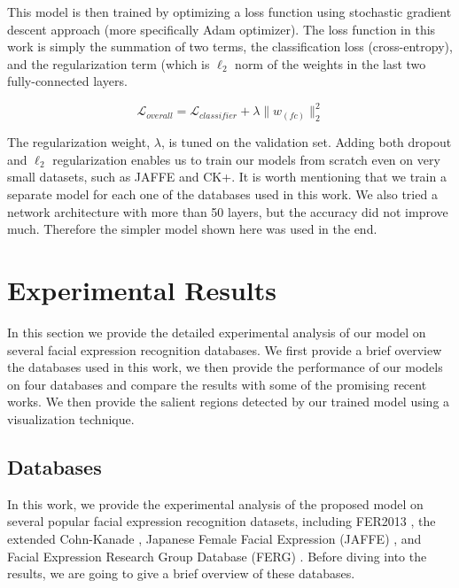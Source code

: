 \documentclass[conference]{IEEEtran}
\begin{document}
This model is then trained by optimizing a loss function using  stochastic gradient descent approach (more specifically Adam optimizer). The loss function in this work is simply the summation of two terms, the classification loss (cross-entropy), and the regularization term (which is $\ell_2$ norm of the weights in the last two fully-connected layers.

\begin{equation}
\mathcal{L}_{overall}= \mathcal{L}_{classifier}+ \lambda \|w_{(fc)}\|_2^2
\end{equation}

The regularization weight, $\lambda$, is tuned on the validation set. 
Adding both dropout and $\ell_2$ regularization enables us to train our models from scratch even on very small datasets, such as JAFFE and CK+. 
It is worth mentioning that we train a separate model for each one of the databases used in this work.
We also tried a network architecture with more than 50 layers, but the accuracy did not improve much. Therefore the simpler model shown here was used in the end.







\section{Experimental Results}
In this section we provide the detailed experimental analysis of our model on several facial expression recognition databases. We first provide a brief overview the databases used in this work, we then provide the performance of our models on four databases and compare the results with some of the promising recent works. 
We then provide the salient regions detected by our trained model using a visualization technique. 
\subsection{Databases}
In this work, we provide the experimental analysis of the proposed model on several popular facial expression recognition datasets, including FER2013 \cite{carrier2013fer}, the extended Cohn-Kanade \cite{ckplus}, Japanese Female Facial Expression (JAFFE) \cite{lyons1998japanese}, and Facial Expression Research Group Database (FERG) \cite{aneja2016modeling}.
Before diving into the results, we are going to give a brief overview of these databases.
\end{document}
